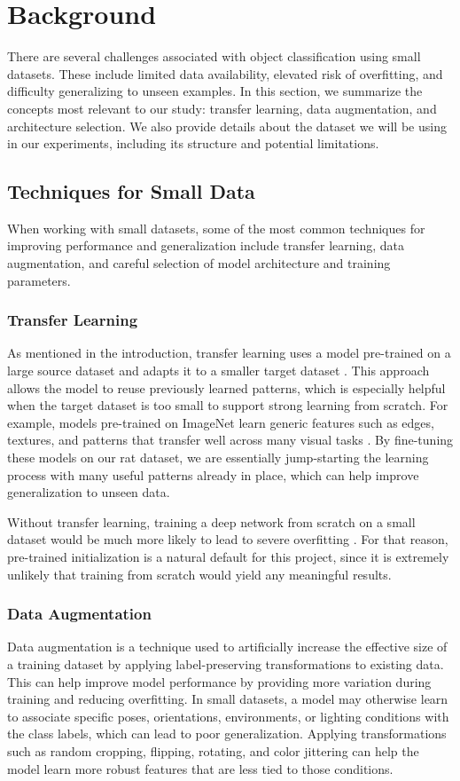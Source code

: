 \documentclass[conference]{IEEEtran}
\begin{document}
\section{Background}
There are several challenges associated with object classification using small datasets. These include limited data availability, elevated risk of overfitting, and difficulty generalizing to unseen examples. In this section, we summarize the concepts most relevant to our study: transfer learning, data augmentation, and architecture selection. We also provide details about the dataset we will be using in our experiments, including its structure and potential limitations.

\subsection{Techniques for Small Data}
When working with small datasets, some of the most common techniques for improving performance and generalization include transfer learning, data augmentation, and careful selection of model architecture and training parameters.

\subsubsection{Transfer Learning}
As mentioned in the introduction, transfer learning uses a model pre-trained on a large source dataset and adapts it to a smaller target dataset \cite{pan2010transfer}. This approach allows the model to reuse previously learned patterns, which is especially helpful when the target dataset is too small to support strong learning from scratch. For example, models pre-trained on ImageNet learn generic features such as edges, textures, and patterns that transfer well across many visual tasks \cite{deng2009imagenet}. By fine-tuning these models on our rat dataset, we are essentially jump-starting the learning process with many useful patterns already in place, which can help improve generalization to unseen data.

Without transfer learning, training a deep network from scratch on a small dataset would be much more likely to lead to severe overfitting \cite{goodfellow2016deep}. For that reason, pre-trained initialization is a natural default for this project, since it is extremely unlikely that training from scratch would yield any meaningful results.

\subsubsection{Data Augmentation}
Data augmentation is a technique used to artificially increase the effective size of a training dataset by applying label-preserving transformations to existing data. This can help improve model performance by providing more variation during training and reducing overfitting. In small datasets, a model may otherwise learn to associate specific poses, orientations, environments, or lighting conditions with the class labels, which can lead to poor generalization. Applying transformations such as random cropping, flipping, rotating, and color jittering can help the model learn more robust features that are less tied to those conditions.
\end{document}
